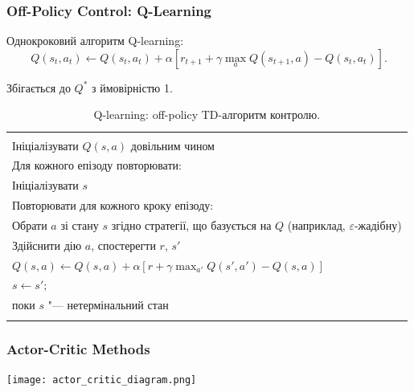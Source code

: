 \subsubsection{Off-Policy Control: Q-Learning}

Однокроковий алгоритм Q-learning:
\begin{equation}
Q(s_t,a_t) \leftarrow Q(s_t,a_t) + \alpha\left[r_{t+1} + \gamma \max_a Q(s_{t+1},a) - Q(s_t,a_t)\right].
\end{equation}

Збігається до $Q^*$ з ймовірністю 1.

\begin{table}
\centering
\label{Q_algorithm}
\begin{tabular}{|l|}
\hline\\
Ініціалізувати $Q(s,a)$ довільним чином\\
Для кожного епізоду повторювати:\\
\hspace{0.5cm} Ініціалізувати $s$\\
\hspace{0.5cm} Повторювати для кожного кроку епізоду:\\
\hspace{1cm} Обрати $a$ зі стану $s$ згідно стратегії, що базується на $Q$ (наприклад, $\varepsilon$-жадібну)\\
\hspace{1cm} 	Здійснити дію $a$, спостерегти $r$, $s'$\\
\hspace{1cm} 	$Q(s,a) \leftarrow Q(s,a) + \alpha\left[r + \gamma \max_{a'}Q(s',a') - Q(s,a)\right]$\\
\hspace{1cm} 	$s \leftarrow s';$\\
\hspace{0.5cm} поки $s$ "--- нетермінальний стан\\
\\
\hline
\end{tabular}
\caption{Q-learning: off-policy TD-алгоритм контролю.}
\end{table}

\subsubsection{Actor-Critic Methods}

\begin{center}\texttt{[image: actor\_critic\_diagram.png]}\end{center}
